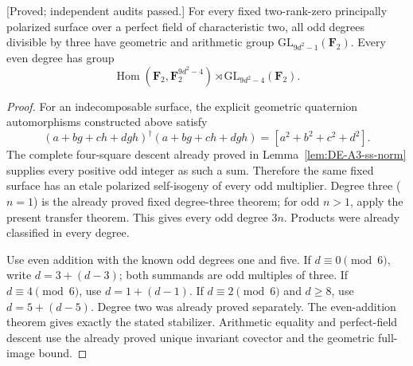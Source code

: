 \begin{corollary}
\label{cor:f0-all-even-nine-theta-transfer-candidate}
\textup{[Proved; independent audits passed.]}
For every fixed two-rank-zero principally polarized surface over
a perfect field of characteristic two, all odd degrees divisible
by three have geometric and arithmetic group
$\mathrm{GL}_{9d^2-1}(\mathbf F_2)$. Every even degree has group
\[
 \operatorname{Hom}(\mathbf F_2,\mathbf F_2^{9d^2-4})\rtimes
            \mathrm{GL}_{9d^2-4}(\mathbf F_2).
\]
\end{corollary}

\begin{proof}
For an indecomposable surface, the explicit geometric quaternion
automorphisms constructed above satisfy
\[
 (a+bg+ch+dgh)^\dagger(a+bg+ch+dgh)
                         =[a^2+b^2+c^2+d^2].
\]
The complete four-square descent already proved in
Lemma~\ref{lem:DE-A3-ss-norm} supplies every positive odd integer
as such a sum. Therefore the same fixed surface has an etale
polarized self-isogeny of every odd multiplier. Degree three
($n=1$) is the already proved fixed degree-three theorem; for
odd $n>1$, apply the present transfer theorem. This gives every
odd degree $3n$. Products were already classified in every degree.

Use even addition with the known odd degrees one and five.
If $d\equiv0\pmod6$, write $d=3+(d-3)$; both summands are odd
multiples of three. If $d\equiv4\pmod6$, use $d=1+(d-1)$.
If $d\equiv2\pmod6$ and $d\ge8$, use $d=5+(d-5)$.
Degree two was already proved separately. The even-addition
theorem gives exactly the stated stabilizer. Arithmetic equality
and perfect-field descent use the already proved unique invariant
covector and the geometric full-image bound.
\end{proof}

